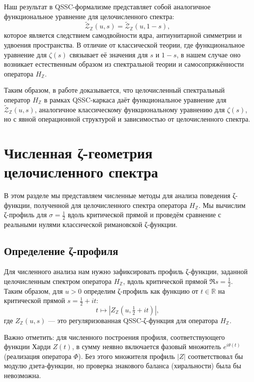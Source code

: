 \documentclass{article}
\numberwithin{equation}{section}
\theoremstyle{plain}
\theoremstyle{definition}
\theoremstyle{remark}
\def\theta{θ}\def\Theta{Θ}\def\pi{π}\def\Pi{Π}%
\begin{document}
Наш результат в QSSC-формализме представляет собой аналогичное
функциональное уравнение для целочисленного спектра:
\[
\widetilde{\mathcal Z}_{\mathbb Z}(u,s) = \widetilde{\mathcal Z}_{\mathbb Z}(u,1-s),
\]
которое является следствием самодвойности ядра, антиунитарной
симметрии и удвоения пространства. В отличие от классической теории,
где функциональное уравнение для $\zeta(s)$ связывает её значения
для $s$ и $1-s$, в нашем случае оно возникает естественным образом
из спектральной теории и самосопряжённости оператора $H_{\mathbb Z}$.

Таким образом, в работе доказывается, что целочисленный спектральный
оператор $H_{\mathbb Z}$ в рамках QSSC-каркаса даёт функциональное
уравнение для $\widetilde{\mathcal Z}_{\mathbb Z}(u,s)$,
аналогичное классическому функциональному уравнению для $\zeta(s)$,
но с явной операционной структурой и зависимостью от целочисленного спектра.
\clearpage

\section{Численная ζ-геометрия целочисленного спектра}
\label{sec:numerics}

\noindent
В этом разделе мы представляем численные методы для анализа поведения ζ-функции, полученной для целочисленного спектра оператора \( H_{\mathbb Z} \). Мы вычислим ζ-профиль для \( \sigma = \tfrac{1}{2} \) вдоль критической прямой и проведём сравнение с реальными нулями классической римановской ζ-функции.

\subsection{Определение ζ-профиля}
\label{subsec:Z-profile}

\noindent
Для численного анализа нам нужно зафиксировать профиль ζ-функции, заданной целочисленным спектром оператора \( H_{\mathbb Z} \), вдоль критической прямой \( \Re s = \tfrac{1}{2} \). Таким образом, для \( u > 0 \) определим ζ-профиль как функцию от \( t \in \mathbb R \) на критической прямой \( s = \tfrac{1}{2} + it \):
\[
t \mapsto |Z_{\mathbb Z}(u,\tfrac{1}{2} + it)|,
\]
где \( Z_{\mathbb Z}(u,s) \) — это регуляризованная QSSC-ζ-функция для оператора \( H_{\mathbb Z} \).

Важно отметить: для численного построения профиля, соответствующего функции Харди \( Z(t) \), в сумму неявно включается фазовый множитель \( e^{i\theta(t)} \) (реализация оператора \( \Phi \)). Без этого множителя профиль \( |Z| \) соответствовал бы модулю дзета-функции, но проверка знакового баланса (хиральности) была бы невозможна.
\end{document}
